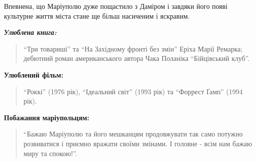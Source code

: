 
Впевнена, що Маріуполю дуже пощастило з Даміром і завдяки його появі культурне
життя міста стане ще більш насиченим і яскравим.

\begingroup
\em
\textbf{Улюблена книга:} 

\begin{quote}
\enquote{Три товариші} та \enquote{На Західному фронті без змін} Еріха Марії Ремарка; дебютний роман американського автора Чака Поланіка \enquote{Бійцівський клуб}.
\end{quote}
 
\textbf{Улюблений фільм:} 

\begin{quote}
\enquote{Роккі} (1976 рік), \enquote{Ідеальний світ} (1993 рік) та \enquote{Форрест Ґамп} (1994 рік).
\end{quote}

\textbf{Побажання маріупольцям:} 

\begin{quote}
\enquote{Бажаю Маріуполю та його мешканцям продовжувати так само потужно розвиватися і приємно вражати своїми змінами. І головне - всім нам бажаю миру та спокою!}.
\end{quote}
\endgroup
